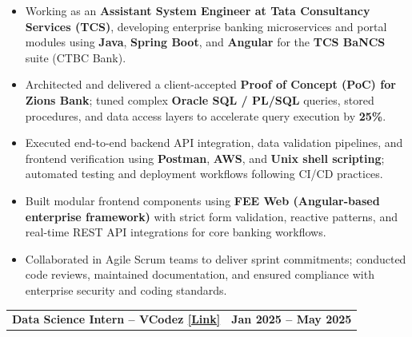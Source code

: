\documentclass[10pt,a4paper]{article}
\makeatletter
\newcommand{\entry}[2]{%
    \noindent
    \begin{tabularx}{\linewidth}{@{}X r@{}}
        \textbf{#1} & \textbf{#2}
    \end{tabularx}
    \vspace{-2pt}
}
\makeatother
\begin{document}
\begin{itemize}

\item Working as an \textbf{Assistant System Engineer at Tata Consultancy Services (TCS)}, developing enterprise banking microservices and portal modules using \textbf{Java}, \textbf{Spring Boot}, and \textbf{Angular} for the \textbf{TCS BaNCS} suite (CTBC Bank).

\item Architected and delivered a client-accepted \textbf{Proof of Concept (PoC) for Zions Bank}; tuned complex \textbf{Oracle SQL / PL/SQL} queries, stored procedures, and data access layers to accelerate query execution by \textbf{25\%}.

\item Executed end-to-end backend API integration, data validation pipelines, and frontend verification using \textbf{Postman}, \textbf{AWS}, and \textbf{Unix shell scripting}; automated testing and deployment workflows following CI/CD practices.

\item Built modular frontend components using \textbf{FEE Web (Angular-based enterprise framework)} with strict form validation, reactive patterns, and real-time REST API integrations for core banking workflows.

\item Collaborated in Agile Scrum teams to deliver sprint commitments; conducted code reviews, maintained documentation, and ensured compliance with enterprise security and coding standards.

\end{itemize}

\vspace{1pt}

\entry
{Data Science Intern -- VCodez
\hspace{2pt}
\href{https://drive.google.com/file/d/1MUiyR5VtfOmQutr5kUR_pSrWpGUQyBYy/view}
{\textcolor{linkblue}{[Link]}}}
{Jan 2025 -- May 2025}
\end{document}
